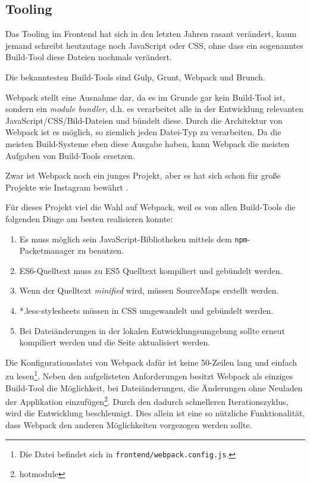 \documentclass[12pt,twoside]{book}
\begin{document}
\subsection{Tooling}

Das Tooling im Frontend hat sich in den letzten Jahren rasant verändert, kaum jemand schreibt heutzutage noch JavaScript oder CSS, ohne dass ein sogenanntes Build-Tool diese Dateien nochmals verändert.

Die bekanntesten Build-Tools sind Gulp\cite{gulp}, Grunt\cite{grunt}, Webpack\cite{webpack} und Brunch\cite{brunch}.

Webpack stellt eine Ausnahme dar, da es im Grunde gar kein Build-Tool ist, sondern ein \textit{module bundler}, d.h. es verarbeitet alle in der Entwicklung relevanten JavaScript/CSS/Bild-Dateien und bündelt diese. Durch die Architektur von Webpack ist es möglich, so ziemlich jeden Datei-Typ zu verarbeiten.
Da die meisten Build-Systeme eben diese Ausgabe haben, kann Webpack die meisten Aufgaben von Build-Tools ersetzen.

Zwar ist Webpack noch ein junges Projekt, aber es hat sich schon für große Projekte wie Instagram bewährt \cite{petehuntwebpack}.

Für dieses Projekt viel die Wahl auf Webpack, weil es von allen Build-Tools die folgenden Dinge am besten realisieren konnte:

\begin{enumerate}
	\item Es muss möglich sein JavaScript-Bibliotheken mittels dem \texttt{npm}-Packetmanager zu benutzen.
	\item ES6-Quelltext muss zu ES5 Quelltext kompiliert und gebündelt werden.
	\item Wenn der Quelltext \textit{minified} wird, müssen SourceMaps erstellt werden.
	\item *.less-stylesheets müssen in CSS umgewandelt und gebündelt werden.
	\item Bei Dateiänderungen in der lokalen Entwicklungsumgebung sollte erneut kompiliert werden und die Seite aktualisiert werden.
\end{enumerate}

Die Konfigurationsdatei von Webpack dafür ist keine 50-Zeilen lang und einfach zu lesen\footnote{Die Datei befindet sich in \texttt{frontend/webpack.config.js}.}. Neben den aufgelisteten Anforderungen besitzt Webpack als einziges Build-Tool die Möglichkeit, bei Dateiänderungen, die Änderungen ohne Neuladen der Applikation einzufügen\footnote{hotmodule}. Durch den dadurch schnelleren Iterationszyklus, wird die Entwicklung beschleunigt. Dies allein ist eine so nützliche Funktionalität, dass Webpack  den anderen Möglichkeiten vorgezogen werden sollte.
\end{document}
